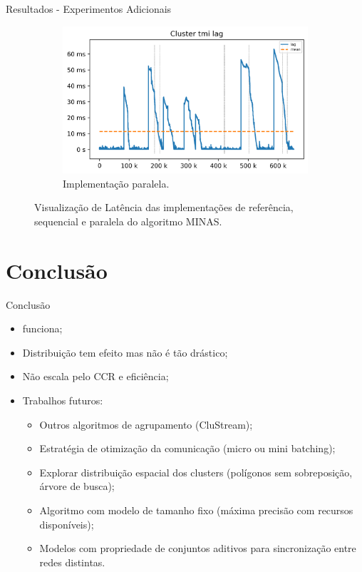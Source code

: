 \documentclass[aspectratio=1610,10pt]{beamer}
\newcommand{\minas}{MINAS\xspace}
\begin{document}
\begin{frame}{Resultados - Experimentos Adicionais}
    \begin{figure}[h]
      \centering
      \begin{subfigure}{0.49\textwidth}
        \centering
        \includegraphics[width=1\linewidth]{experiments/lag-mfog.png}
        \caption{Implementação paralela.}
        \label{fig:lag-mfog}
      \end{subfigure}
      \caption{Visualização de Latência das implementações de referência, sequencial
      e paralela do algoritmo \minas.}
      \label{fig:lag-2}
    \end{figure}
\end{frame}

\section{Conclusão}
\begin{frame}{Conclusão}
  \begin{itemize}
    \item \mfog funciona;
    \item Distribuição tem efeito mas não é tão drástico;
    \item Não escala pelo CCR e eficiência;
    \item Trabalhos futuros:
    \begin{itemize}
      \item Outros algoritmos de agrupamento (CluStream);
      \item Estratégia de otimização da comunicação (micro ou mini batching);
      \item Explorar distribuição espacial dos clusters (polígonos sem
      sobreposição, árvore de busca);
      \item Algoritmo com modelo de tamanho fixo (máxima precisão com recursos disponíveis);
      \item Modelos com propriedade de conjuntos aditivos para sincronização
      entre redes distintas.
    \end{itemize}
  \end{itemize}
\end{frame}
\end{document}
